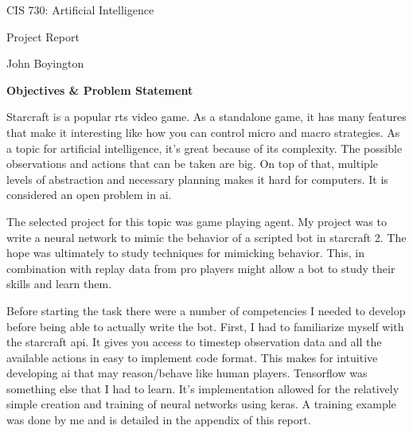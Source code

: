 \documentclass{amsart}
\theoremstyle{definition}
\begin{document}
\LARGE{CIS 730: Artificial Intelligence}
 
\large
Project Report
 
John Boyington
\newline
\bigskip









\textbf{Objectives \& Problem Statement}


Starcraft is a popular rts video game.
As a standalone game, it has many features that make it interesting like how you can control micro and macro strategies.
As a topic for artificial intelligence, it's great because of its complexity.
The possible observations and actions that can be taken are big.
On top of that, multiple levels of abstraction and necessary planning makes it hard for computers.
It is considered an open problem in ai.

The selected project for this topic was game playing agent.
My project was to write a neural network to mimic the behavior of a scripted bot in starcraft 2.
The hope was ultimately to study techniques for mimicking behavior.
This, in combination with replay data from pro players might allow a bot to study their skills and learn them.

Before starting the task there were a number of competencies I needed to develop before being able to actually write the bot.
First, I had to familiarize myself with the starcraft api.
It gives you access to timestep observation data and all the available actions in easy to implement code format.
This makes for intuitive developing ai that may reason/behave like human players.
Tensorflow was something else that I had to learn.
It's implementation allowed for the relatively simple creation and training of neural networks using keras.
A training example was done by me and is detailed in the appendix of this report.
\end{document}
